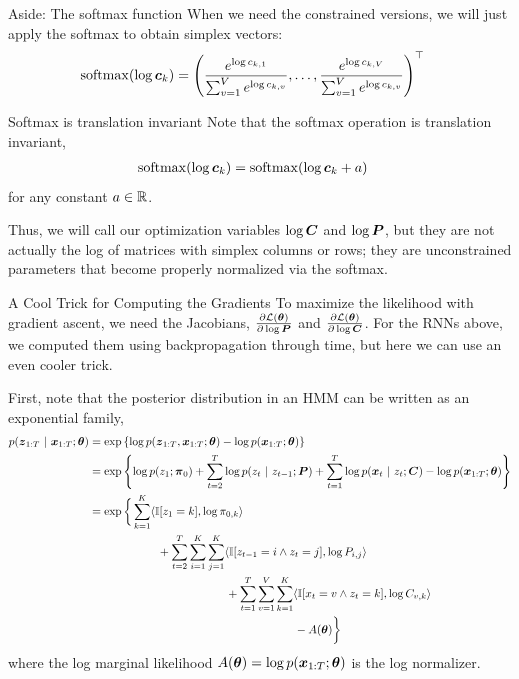 \documentclass[aspectratio=169]{beamer}
\begin{document}
\begin{frame}[t,allowframebreaks]{Aside: The softmax function}
When we need the constrained versions,
we will just apply the softmax to obtain simplex vectors: 
\begin{align*}
\mathrm{softmax}(\log \boldsymbol{c}_k) 
&= \left(
    \frac{e^{\log c_{k,1}}}{\sum_{v=1}^V e^{\log c_{k,v}}}, 
    \ldots,
    \frac{e^{\log c_{k,V}}}{\sum_{v=1}^V e^{\log c_{k,v}}}
 \right)^\top
\end{align*}

Softmax is translation invariant Note that the softmax
operation is translation invariant, 
\begin{align*}
\mathrm{softmax}(\log \boldsymbol{c}_k) &=
\mathrm{softmax}(\log \boldsymbol{c}_k + a) 
\end{align*} for any constant \(a \in \mathbb{R}\). 

Thus, we will call our
optimization variables \(\log \boldsymbol{C}\) and \(\log \boldsymbol{P}\), but they are not
actually the log of matrices with simplex columns or rows; they are
unconstrained parameters that become properly normalized via the
softmax. 
\end{frame}

\begin{frame}[t,allowframebreaks]{A Cool Trick for Computing the
    Gradients}\label{a-cool-trick-for-computing-the-gradients}
To maximize the likelihood with gradient ascent, we need the Jacobians,
\(\frac{\partial \mathcal{L}(\boldsymbol{\theta})}{\partial \log \boldsymbol{P}}\) and
\(\frac{\partial \mathcal{L}(\boldsymbol{\theta})}{\partial \log \boldsymbol{C}}\). For the RNNs
above, we computed them using backpropagation through time, but here we
can use an even cooler trick.

First, note that the posterior distribution in an HMM can be written as
an exponential family, 
\begin{align*}
p(\mbz_{1:T} \mid \mbx_{1:T}; \mbtheta) 
&= \exp \left\{ \log p(\mbz_{1:T}, \mbx_{1:T}; \mbtheta) - \log p(\mbx_{1:T}; \mbtheta) \right\} \\
&= \exp \left\{ 
    \log p(z_1; \mbpi_0) 
    + \sum_{t=2}^T \log p(z_t \mid z_{t-1}; \mbP) 
    + \sum_{t=1}^T \log p(\mbx_t \mid z_{t}; \mbC) 
    - \log p(\mbx_{1:T}; \mbtheta)
    \right\} \\
&= \exp \bigg\{ 
    \sum_{k=1}^K \langle \bbI[z_1 =k], \log \pi_{0,k} \rangle \\
    &\hspace{6em}
    + \sum_{t=2}^T \sum_{i=1}^K \sum_{j=1}^K \langle \bbI[z_{t-1}=i \wedge z_{t} = j],  \log P_{i,j} \rangle \\
    &\hspace{12em}
    + \sum_{t=1}^T \sum_{v=1}^V \sum_{k=1}^K \langle \bbI[x_t = v \wedge z_t = k], \log C_{v,k} \rangle \\
    &\hspace{18em} - A(\mbtheta)
    \bigg\} 
\end{align*} 
where the log marginal likelihood
\(A(\boldsymbol{\theta}) = \log p(\boldsymbol{x}_{1:T}; \boldsymbol{\theta})\) is the log normalizer.
\end{frame}
\end{document}
